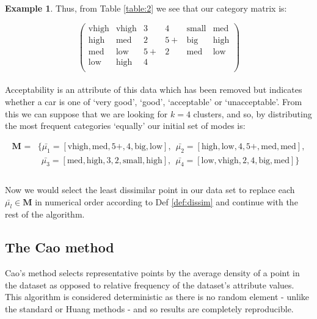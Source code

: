 \documentclass{article}
\theoremstyle{definition}
\newtheorem{example}{Example}
\begin{document}
\begin{example}
	Thus, from Table \ref{table:2} we see that our category matrix is:
	
	\[
	\begin{pmatrix}		
		\text{vhigh}	&	\text{vhigh}	&	3	&	4	&	\text{small}	&	\text{med}	\\
		\text{high}		&	\text{med}		&	2	&	5+	&	\text{big}	&	\text{high}		\\
		\text{med}		&	\text{low}		&	5+	&	2	&	\text{med}	&	\text{low}		\\
		\text{low}		&	\text{high}		&	4	&	{}	&			{}			&			{}			\\
	\end{pmatrix}
	\] \\
	
	
	Acceptability is an attribute of this data which has been removed but indicates whether a car is one of `very good', `good', `acceptable' or `unacceptable'. From this we can suppose that we are looking for $k = 4$ clusters, and so, by distributing the most frequent categories `equally' our initial set of modes is:
	
	\begin{equation}
	\begin{aligned}
	 \textbf{M }={} & \{\bar{\mu_1} = [\text{vhigh}, \text{med}, 5+, 4, \text{big}, \text{low}], \ \ \bar{\mu_2} = [\text{high}, \text{low}, 4, 5+, \text{med}, \text{med}], \\
						  & \ \ \bar{\mu_3} = [\text{med}, \text{high}, 3, 2, \text{small}, \text{high}], \ \ \bar{\mu_4} = [\text{low}, \text{vhigh}, 2, 4, \text{big}, \text{med}] \} \\
	\end{aligned}
	\end{equation} \\
	
	Now we would select the least dissimilar point in our data set to replace each $\bar{\mu_l} \in \textbf{M}$ in numerical order according to Def \ref{def:dissim} and continue with the rest of the algorithm. \\
\end{example}


\subsection{The Cao method}\label{subsection:cao}

Cao's method selects representative points by the average density of a point in the dataset as opposed to relative frequency of the dataset's attribute values. This algorithm is considered deterministic as there is no random element - unlike the standard or Huang methods - and so results are completely reproducible.
\end{document}
